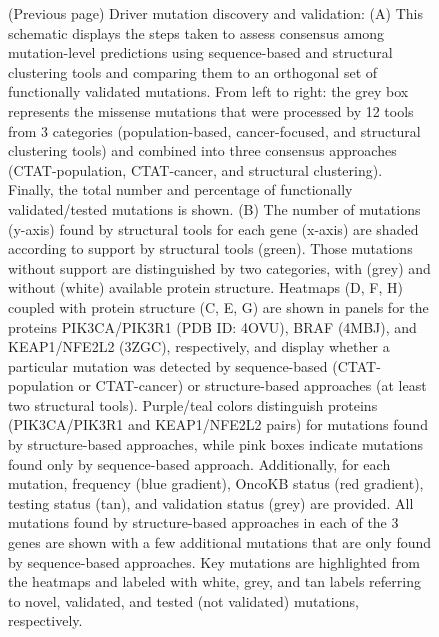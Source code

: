 \begin{figure} [t!]
  \caption[Driver mutation discovery and validation]{(Previous page) Driver mutation discovery and validation: (A) This schematic displays the steps taken to assess consensus among mutation-level predictions using sequence-based and structural clustering tools and comparing them to an orthogonal set of functionally validated mutations. From left to right: the grey box represents the missense mutations that were processed by 12 tools from 3 categories (population-based, cancer-focused, and structural clustering tools) and combined into three consensus approaches (CTAT-population, CTAT-cancer, and structural clustering). Finally, the total number and percentage of functionally validated/tested mutations is shown. (B) The number of mutations (y-axis) found by structural tools for each gene (x-axis) are shaded according to support by structural tools (green). Those mutations without support are distinguished by two categories, with (grey) and without (white) available protein structure.  Heatmaps (D, F, H) coupled with protein structure (C, E, G) are shown in panels for the proteins PIK3CA/PIK3R1 (PDB ID: 4OVU), BRAF (4MBJ), and KEAP1/NFE2L2 (3ZGC), respectively, and display whether a particular mutation was detected by sequence-based (CTAT-population or CTAT-cancer) or structure-based approaches (at least two structural tools). Purple/teal colors distinguish proteins (PIK3CA/PIK3R1 and KEAP1/NFE2L2 pairs) for mutations found by structure-based approaches, while pink boxes indicate mutations found only by sequence-based approach. Additionally, for each mutation, frequency (blue gradient), OncoKB status (red gradient), testing status (tan), and validation status (grey) are provided. All mutations found by structure-based approaches in each of the 3 genes are shown with a few additional mutations that are only found by sequence-based approaches. Key mutations are highlighted from the heatmaps and labeled with white, grey, and tan labels referring to novel, validated, and tested (not validated) mutations, respectively.}
\end{figure}

